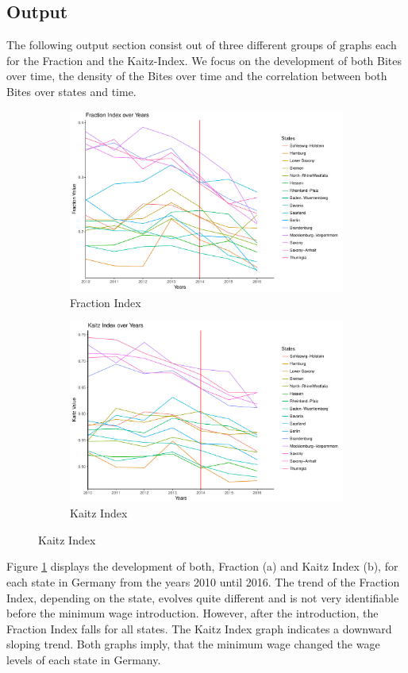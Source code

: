 \documentclass[a4paper]{article}
\begin{document}
{\subsection{Output}
The following output section consist out of three different groups of graphs each for the Fraction and the Kaitz-Index. We focus on the development of both Bites over time, the density of the Bites over time and the correlation between both Bites over states and time.
%
\begin{figure}
\caption{Fraction and Kaitz Index over Time}
\begin{subfigure}[h]{0.5\linewidth}
\includegraphics[width=\textwidth]{q5/aggregateddatafraction.pdf}
\caption{Fraction Index}
\end{subfigure}
%
\begin{subfigure}[h]{0.5\linewidth}
\includegraphics[width=\textwidth]{q5/aggregateddatakaitz.pdf}
\caption{Kaitz Index}
\end{subfigure}
\label{q5graph1}
\end{figure}
%
%
%
Figure \ref{q5graph1} displays the development of both, Fraction (a) and Kaitz Index (b), for each state in Germany from the years 2010 until 2016. The trend of the Fraction Index, depending on the state, evolves quite different and is not very identifiable before the minimum wage introduction. However, after the introduction, the Fraction Index falls for all states. %
The Kaitz Index graph indicates a downward sloping trend. Both graphs imply, that the minimum wage changed the wage levels of each state in Germany.


}
\end{document}
